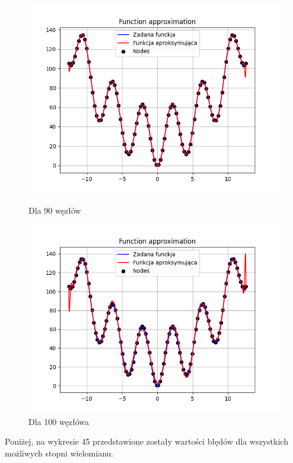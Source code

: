 \documentclass{article}
\begin{document}
\begin{figure}[H]
\begin{minipage}[b]{0.49\textwidth}
    \begin{minipage}[b]{\textwidth}
      \includegraphics[width=\textwidth]{img45.png}
      \caption{Dla 90 węzłów}
    \end{minipage}
    \vspace*{\fill}
    \begin{minipage}[b]{\textwidth}
      \includegraphics[width=\textwidth]{img46.png}
      \caption{Dla 100 węzłówa}
    \end{minipage}
  \end{minipage}
\end{figure}

Poniżej, na wykresie 45 przedstawione zostały wartości błędów dla wszystkich możliwych stopni wielomianu.
\end{document}
